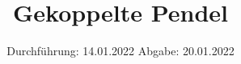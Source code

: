 

\subject{VERSUCH 106}
\title{Gekoppelte Pendel}
\date{%
  Durchführung: 14.01.2022
  \hspace{3em}
  Abgabe: 20.01.2022
}



\maketitle
\thispagestyle{empty}
\tableofcontents
\newpage








\printbibliography{}



